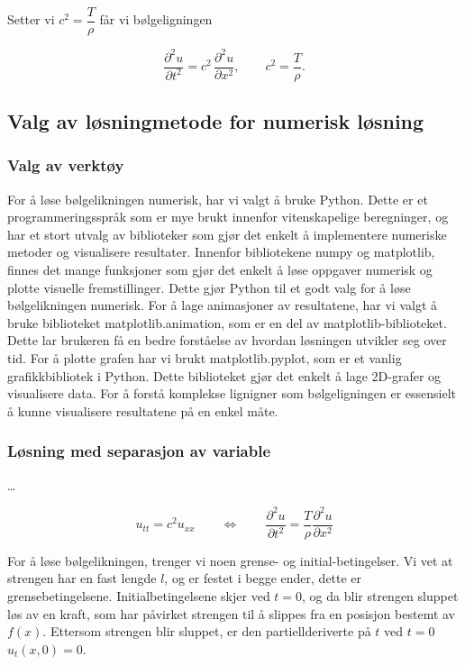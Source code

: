 Setter vi \(c^2=\dfrac{T}{\rho}\) får vi bølgeligningen

\begin{equation}
  \frac{\partial^2 u}{\partial t^2}
  = c^2\,\frac{\partial^2 u}{\partial x^2},
  \qquad
  c^2=\frac{T}{\rho}.
  \label{eq:utledetBolgelikning}
\end{equation}

\subsection{Valg av løsningmetode for numerisk løsning}
\subsubsection{Valg av verktøy}
For å løse bølgelikningen numerisk, har vi valgt å bruke Python. Dette er et programmeringsspråk som er mye brukt innenfor vitenskapelige
beregninger, og har et stort utvalg av biblioteker som gjør det enkelt å implementere numeriske metoder og visualisere resultater. Innenfor 
bibliotekene numpy og matplotlib, finnes det mange funksjoner som gjør det enkelt å løse oppgaver numerisk og plotte visuelle fremstillinger.
Dette gjør Python til et godt valg for å løse bølgelikningen numerisk. For å lage animasjoner av resultatene, har vi valgt å bruke biblioteket 
matplotlib.animation, som er en del av matplotlib-biblioteket. Dette lar brukeren få en bedre forståelse av hvordan løsningen utvikler seg over tid.
For å plotte grafen har vi brukt matplotlib.pyplot, som er et vanlig grafikkbibliotek i Python. Dette biblioteket gjør det enkelt å lage 2D-grafer og 
visualisere data. For å forstå komplekse lignigner som bølgeligningen er essensielt å kunne visualisere resultatene på en enkel måte.

\subsubsection{Løsning med separasjon av variable}
\dots

\begin{equation}
	u_{tt} = c^2 u_{xx} \qquad \iff \qquad 
	\frac{\partial^2 u}{\partial t^2} = \frac{T}{\rho} \frac{\partial^2 u}{\partial x^2}	
	\label{eq:bølgelikningForLøsning}
\end{equation}

For å løse bølgelikningen, trenger vi noen grense- og initial-betingelser. Vi vet at strengen har en fast lengde $l$,
og er festet i begge ender, dette er grensebetingelsene. Initialbetingelsene skjer ved $t=0$, og da blir strengen
sluppet løs av en kraft, som har påvirket strengen til å slippes fra en posisjon bestemt av $f(x)$.
Ettersom strengen blir sluppet, er den partiellderiverte på $t$ ved $t=0$ $u_t(x,0) = 0$.

